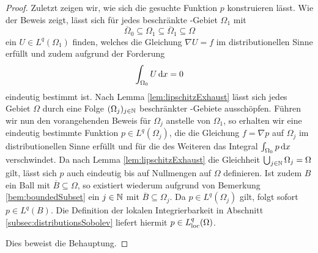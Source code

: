 \begin{proof}
  Zuletzt zeigen wir, wie sich die gesuchte Funktion $p$ konstruieren lässt.
  Wie der Beweis zeigt, lässt sich für jedes beschränkte \lipschitz\hyp{}Gebiet $\Omega_1$ mit $$\overline\Omega_0 \subseteq \Omega_1 \subseteq \overline\Omega_1 \subseteq \Omega$$ ein $U \in L^q(\Omega_1)$ finden, welches die Gleichung $\nabla U = f$ im distributionellen Sinne erfüllt und zudem aufgrund der Forderung 
  $$
  \int_{\Omega_0} U \, {\operatorname{d}\!{x}} = 0
  $$
  eindeutig bestimmt ist.
  Nach Lemma \ref{lem:lipschitzExhaust} lässt sich jedes Gebiet $\Omega$ durch eine Folge $(\Omega_j)_{j \in \mathbb{N}}$ beschränkter \lipschitz\hyp{}Gebiete ausschöpfen.
  Führen wir nun den vorangehenden Beweis für $\Omega_j$ anstelle von $\Omega_1$, so erhalten wir eine eindeutig bestimmte Funktion $p \in L^q(\Omega_j)$, die die Gleichung $f = \nabla p$ auf $\Omega_j$ im distributionellen Sinne erfüllt und für die des Weiteren das Integral $\int_{\Omega_0} p \, {\operatorname{d}\!{x}}$ verschwindet.
  Da nach Lemma \ref{lem:lipschitzExhaust} die Gleichheit $\bigcup_{j \in \mathbb{N}} \Omega_j = \Omega$ gilt, lässt sich $p$ auch eindeutig bis auf Nullmengen auf $\Omega$ definieren.
  Ist zudem $B$ ein Ball mit $\overline B \subseteq \Omega$, so existiert wiederum aufgrund von Bemerkung \ref{bem:boundedSubset} ein $j \in \mathbb{N}$ mit $\overline B \subseteq \Omega_j$.
  Da $p \in L^q(\Omega_j)$ gilt, folgt sofort $p \in L^q(B)$.
  Die Definition der lokalen Integrierbarkeit in Abschnitt \ref{subsec:distributionsSobolev} liefert hiermit $p \in L^q_{\operatorname{loc}}(\Omega)$.

  Dies beweist die Behauptung.
\end{proof}
